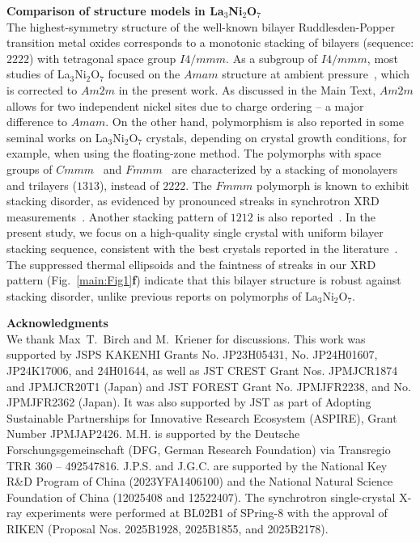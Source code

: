 \documentclass[aps,12pt,floatfix,longbibliography,a4paper]{revtex4-2}
\newcommand{\LNO}{La$_3$Ni$_2$O$_7$}
\begin{document}
\textbf{Comparison of structure models in \LNO{}}\\
The highest-symmetry structure of the well-known bilayer Ruddlesden-Popper transition metal oxides corresponds to a monotonic stacking of bilayers (sequence: $2222$) with tetragonal space group $I4/mmm$. As a subgroup of $I4/mmm$, most studies of \LNO{} focused on the $Amam$ structure at ambient pressure~\cite{Zhang1994-vm,Taniguchi1995-lg,Ling2000-uz,Voronin2001-oc,Wang2024-qi,Wang2025-tg}, which is corrected to $Am2m$ in the present work. As discussed in the Main Text, $Am2m$ allows for two independent nickel sites due to charge ordering -- a major difference to $Amam$. On the other hand, polymorphism is also reported in some seminal works on \LNO{} crystals, depending on crystal growth conditions, for example, when using the floating-zone method. The polymorphs with space groups of $Cmmm$~\cite{Chen2024-dr,Wang2024-ii} and $Fmmm$~\cite{Puphal2024-pw} are characterized by a stacking of monolayers and trilayers ($1313$), instead of $2222$. The $Fmmm$ polymorph is known to exhibit stacking disorder, as evidenced by pronounced streaks in synchrotron XRD measurements~\cite{Puphal2024-pw}. Another stacking pattern of $1212$ is also reported~\cite{Li2024-vg}. 
In the present study, we focus on a high-quality single crystal with uniform bilayer stacking sequence, consistent with the best crystals reported in the literature~\cite{Zhang1994-vm,Taniguchi1995-lg,Ling2000-uz,Voronin2001-oc,Wang2024-qi,Wang2025-tg}. The suppressed thermal ellipsoids and the faintness of streaks in our XRD pattern (Fig.~\ref{main:Fig1}\textbf{f}) indicate that this bilayer structure is robust against stacking disorder, unlike previous reports on polymorphs of \LNO{}.

\newpage

\clearpage
\textbf{Acknowledgments}\\
We thank Max~T.~Birch and M.~Kriener for discussions. This work was supported by JSPS KAKENHI Grants No. JP23H05431, No. JP24H01607, JP24K17006, and 24H01644, as well as JST CREST Grant Nos. JPMJCR1874 and JPMJCR20T1 (Japan) and JST FOREST Grant No. JPMJFR2238, and No. JPMJFR2362 (Japan). It was also supported by JST as part of Adopting Sustainable Partnerships for Innovative Research Ecosystem (ASPIRE), Grant Number JPMJAP2426. M.H. is supported by the Deutsche Forschungsgemeinschaft (DFG, German Research Foundation) via Transregio TRR 360 – 492547816. J.P.S. and J.G.C. are supported by the National Key R\&D Program of China (2023YFA1406100) and the National Natural Science Foundation of China (12025408 and 12522407). The synchrotron single-crystal X-ray experiments were performed at BL02B1 of SPring-8 with the approval of RIKEN (Proposal Nos. 2025B1928, 2025B1855, and 2025B2178). 
\end{document}
